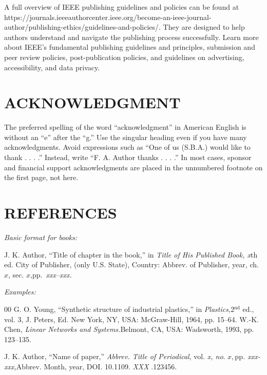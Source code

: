 \documentclass{ieeetj}
\begin{document}
A full overview of IEEE publishing guidelines and policies can be found at https://journals.ieeeauthorcenter.ieee.org/become-an-ieee-journal-author/publishing-ethics/guidelines-and-policies/. They are designed to help authors understand and navigate the publishing process successfully. Learn more about IEEE's fundamental publishing guidelines and principles, submission and peer review policies, post-publication policies, and guidelines on advertising, accessibility, and data privacy.

\section*{ACKNOWLEDGMENT}
The preferred spelling of the word ``acknowledgment'' in
American English is without an ``e'' after the ``g.'' Use the
singular heading even if you have many acknowledgments.
Avoid expressions such as ``One of us (S.B.A.) would like
to thank . . . .'' Instead, write ``F. A. Author thanks . . . .'' In
most cases, sponsor and financial support acknowledgments
are placed in the unnumbered footnote on the first page, not
here.

\section*{REFERENCES}

\def\refname{\vadjust{\vspace*{-2.5em}}} %

\noindent\textit{Basic format for books:}

\noindent J. K. Author, ``Title of chapter in the book,'' in {\it Title of His Published Book, x}th ed. City of Publisher,
(only U.S. State), Country: Abbrev. of Publisher, year, ch. $x$, sec. $x$,\break pp.~{\it xxx--xxx.}

{\it Examples:}

\begin{thebibliography}{00}
 G. O. Young, ``Synthetic structure of industrial plastics,'' in {\it Plastics,}2$^{\mathrm{nd}}$ ed., vol. 3, J. Peters, Ed. New York, NY, USA: McGraw-Hill, 1964, pp. 15--64.
 W.-K. Chen, {\it Linear Networks and Systems.}Belmont, CA, USA: Wadsworth, 1993, pp. 123--135.
\end{thebibliography}


\noindent J. K. Author, ``Name of paper,'' {\it Abbrev. Title of Periodical}, vol. {\it x, no}. $x, $pp{\it . xxx-xxx,}Abbrev. Month, year, DOI.
 {10.1109.} {{\it XXX}} {.123456}.
\end{document}
